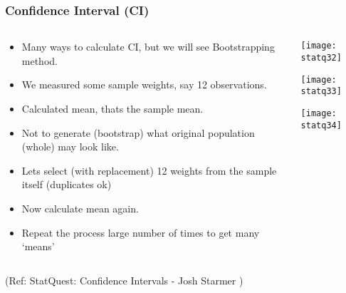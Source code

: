 \begin{frame}[fragile]\frametitle{Confidence Interval (CI)}
\begin{columns}
    \begin{column}[T]{0.6\linewidth}
	\begin{itemize}
	\item Many ways to calculate CI, but we will see Bootstrapping method.
	\item We measured some sample weights, say 12 observations. 
	\item Calculated mean, thats the sample mean.
	\item Not to generate (bootstrap) what original population (whole) may look like.
	\item Lets select (with replacement) 12 weights from the sample itself (duplicates ok)
	\item Now calculate mean again.
	\item Repeat the process large number of times to get many `means'
	\end{itemize}

    \end{column}
    \begin{column}[T]{0.4\linewidth}
      \begin{center}
      \texttt{[image: statq32]}
	  
	  \texttt{[image: statq33]}

	  \texttt{[image: statq34]}
	  
	  	\end{center}
    \end{column}

  \end{columns}
  
\tiny{(Ref: StatQuest: Confidence Intervals - Josh Starmer )}
\end{frame}

